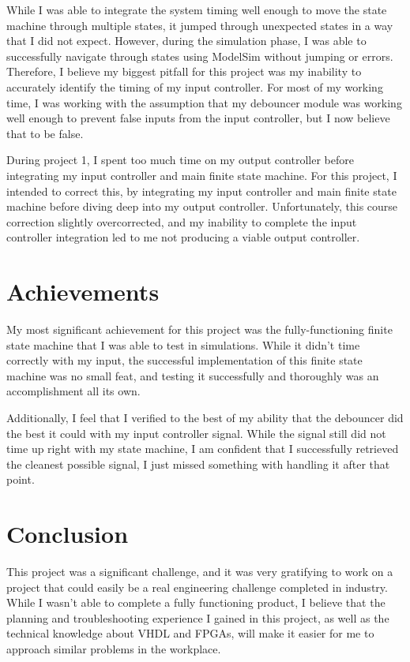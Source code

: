 \documentclass[11pt]{article}
\begin{document}
While I was able to integrate the system timing well enough to move the state machine through multiple states, it jumped through unexpected states in a way that I did not expect. However, during the simulation phase, I was able to successfully navigate through states using ModelSim without jumping or errors. Therefore, I believe my biggest pitfall for this project was my inability to accurately identify the timing of my input controller. For most of my working time, I was working with the assumption that my debouncer module was working well enough to prevent false inputs from the input controller, but I now believe that to be false.

During project 1, I spent too much time on my output controller before integrating my input controller and main finite state machine. For this project, I intended to correct this, by integrating my input controller and main finite state machine before diving deep into my output controller. Unfortunately, this course correction slightly overcorrected, and my inability to complete the input controller integration led to me not producing a viable output controller.

\section{Achievements}

My most significant achievement for this project was the fully-functioning finite state machine that I was able to test in simulations. While it didn't time correctly with my input, the successful implementation of this finite state machine was no small feat, and testing it successfully and thoroughly was an accomplishment all its own.

Additionally, I feel that I verified to the best of my ability that the debouncer did the best it could with my input controller signal. While the signal still did not time up right with my state machine, I am confident that I successfully retrieved the cleanest possible signal, I just missed something with handling it after that point.

\section{Conclusion}

This project was a significant challenge, and it was very gratifying to work on a project that could easily be a real engineering challenge completed in industry. While I wasn't able to complete a fully functioning product, I believe that the planning and troubleshooting experience I gained in this project, as well as the technical knowledge about VHDL and FPGAs, will make it easier for me to approach similar problems in the workplace.
\end{document}
